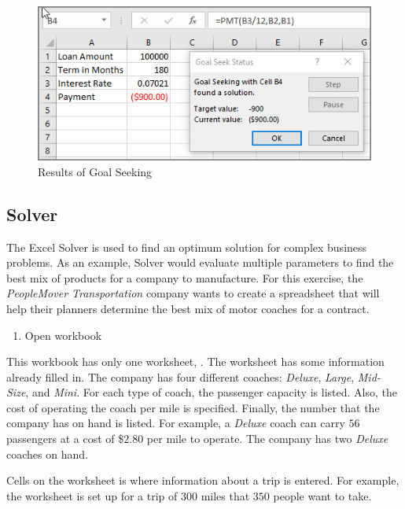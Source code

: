 \begin{figure}[H]
	\centering
	\includegraphics[width=\maxwidth{.95\linewidth}]{gfx/ch08_fig34}
	\caption{Results of Goal Seeking}
	\label{08:fig34}
\end{figure}

\subsection{Solver}

The Excel Solver is used to find an optimum solution for complex business problems. As an example, Solver would evaluate multiple parameters to find the best mix of products for a company to manufacture. For this exercise, the \textit{PeopleMover Transportation} company wants to create a spreadsheet that will help their planners determine the best mix of motor coaches for a contract.

\begin{enumerate}
	\item Open workbook 
\end{enumerate}

This workbook has only one worksheet, . The worksheet has some information already filled in. The company has four different coaches: \textit{Deluxe}, \textit{Large}, \textit{Mid-Size}, and \textit{Mini}. For each type of coach, the passenger capacity is listed. Also, the cost of operating the coach per mile is specified. Finally, the number that the company has on hand is listed. For example, a \textit{Deluxe} coach can carry $ 56 $ passengers at a cost of \$$ 2.80 $ per mile to operate. The company has two \textit{Deluxe} coaches on hand.

Cells  on the worksheet is where information about a trip is entered. For example, the worksheet is set up for a trip of $ 300 $ miles that $ 350 $ people want to take.

